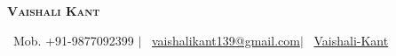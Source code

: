 \documentclass[letterpaper,10.9pt]{article}
\begin{document}

\begin{center}
    \textbf{\Huge \scshape Vaishali Kant} \\ \vspace{1pt}
    \end{center}
\begin{center}
    \small  \faPhone\ Mob. +91-9877092399 \quad $|$  \quad \faEnvelope\ \href{}{{vaishalikant139@gmail.com}}\quad $|$ \quad
    \faLinkedin\ \href{https://www.linkedin.com/in/vaishali-kant-0441aa14b/}{{Vaishali-Kant}}
\end{center}
\vspace{-0.5cm}



\end{document}
